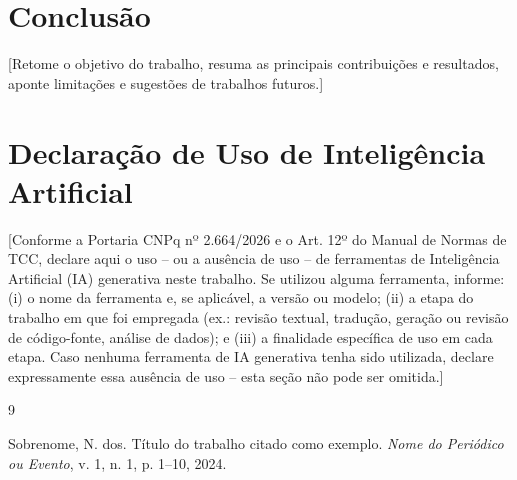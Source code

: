 \documentclass[a4paper,12pt]{article}
\begin{document}
\section{Conclusão}

[Retome o objetivo do trabalho, resuma as principais contribuições e
resultados, aponte limitações e sugestões de trabalhos futuros.]

\section*{Declaração de Uso de Inteligência Artificial}

[Conforme a Portaria CNPq nº 2.664/2026 e o Art. 12º do Manual de Normas
de TCC, declare aqui o uso -- ou a ausência de uso -- de ferramentas de
Inteligência Artificial (IA) generativa neste trabalho. Se utilizou
alguma ferramenta, informe: (i) o nome da ferramenta e, se aplicável, a
versão ou modelo; (ii) a etapa do trabalho em que foi empregada (ex.:
revisão textual, tradução, geração ou revisão de código-fonte, análise
de dados); e (iii) a finalidade específica de uso em cada etapa. Caso
nenhuma ferramenta de IA generativa tenha sido utilizada, declare
expressamente essa ausência de uso -- esta seção não pode ser omitida.]


\begin{thebibliography}{9}

Sobrenome, N. dos.
\newblock Título do trabalho citado como exemplo.
\newblock \emph{Nome do Periódico ou Evento}, v. 1, n. 1, p. 1--10, 2024.

\end{thebibliography}
\end{document}
